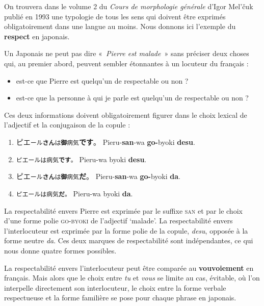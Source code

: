 {    On trouvera dans le volume 2 du \textit{Cours de morphologie générale} d’Igor Mel’čuk publié en 1993 une typologie de tous les sens qui doivent être exprimés obligatoirement dans une langue au moins. Nous donnons ici l’exemple du \textbf{respect} en japonais.

    Un Japonais ne peut pas dire «~\textit{Pierre est malade~}» sans préciser deux choses qui, au premier abord, peuvent sembler étonnantes à un locuteur du français :

    \begin{itemize}
    \item  est-ce que Pierre est quelqu’un de respectable ou non ?
    \item  est-ce que la personne à qui je parle est quelqu’un de respectable ou non ?
    \end{itemize}

    Ces deux informations doivent obligatoirement figurer dans le choix lexical de l’adjectif et la conjugaison de la copule :

    \begin{enumerate}
    \item  \textrm{ピエ}\texttt{ール\textbf{さん}}\texttt{は\textbf{御}}\texttt{病気}\textrm{\textbf{です}}\textrm{。}  Pieru-\textbf{san}{}-wa \textbf{go-}byoki \textbf{desu}.
    \item  \texttt{ピエールは病気\textbf{です}}\texttt{。}    Pieru-wa byoki \textbf{desu}.
    \item  \textrm{ピエ}\texttt{ール\textbf{さん}}\texttt{は\textbf{御}}\texttt{病気}\textrm{\textbf{だ}}\textrm{。} Pieru-\textbf{san}{}-wa \textbf{go-}byoki \textbf{da}.
    \item  \texttt{ピエールは病気\textbf{だ}}\texttt{。}\textbf{    }Pieru-wa byoki \textbf{da}.
    \end{enumerate}

    La respectabilité envers Pierre est exprimée par le suffixe \textsc{san} et par le choix d’une forme polie \textsc{go-byoki} de l’adjectif ‘malade’. La respectabilité envers l’interlocuteur est exprimée par la forme polie de la copule, \textit{desu}, opposée à la forme neutre \textit{da}. Ces deux marques de respectabilité sont indépendantes, ce qui nous donne quatre formes possibles.

    La respectabilité envers l’interlocuteur peut être comparée au \textbf{vouvoiement} en français. Mais alors que le choix entre \textit{tu} et \textit{vous} se limite au cas, évitable, où l’on interpelle directement son interlocuteur, le choix entre la forme verbale respectueuse et la forme familière se pose pour chaque phrase en japonais.
}
